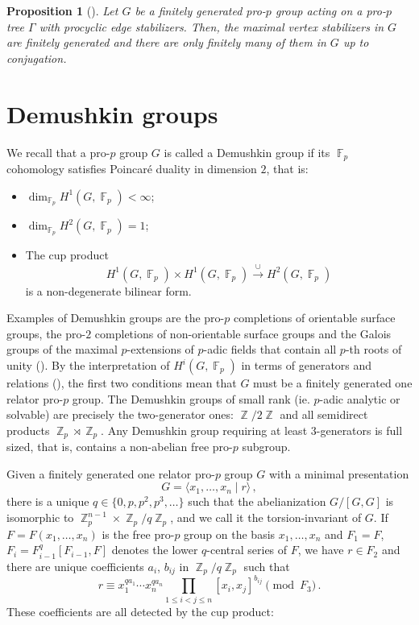 \documentclass[a4paper]{amsart}
\DeclareMathOperator{\bbz}{\mathbb{Z}}
\DeclareMathOperator{\bbf}{\mathbb{F}}
\newtheorem{prop}[thm]{Proposition}
\theoremstyle{definition}
\begin{document}
\begin{prop}[{\cite[Prop. 3.3]{snopceSubgroupPropertiesPro$p$2014}}]\label{prop-finitely-many-stabilizers} Let \(G\) be a finitely generated pro-\(p\) group acting on a pro-\(p\) tree \(\Gamma\) with procyclic edge stabilizers. Then, the maximal vertex stabilizers in \(G\) are finitely generated and there are only finitely many of them in \(G\) up to conjugation.
\end{prop}

\section{Demushkin groups}\label{sec-demushkin}

We recall that a pro-\(p\) group \(G\) is called a Demushkin group if its \(\bbf_p\) cohomology satisfies Poincaré duality in dimension \(2\), that is:
\begin{itemize}
    \item \(\dim_{\bbf_p} H^1(G,\bbf_p) < \infty\);
    \item \(\dim_{\bbf_p} H^2(G,\bbf_p) = 1\);
    \item The cup product \[H^1(G,\bbf_p) \times H^1(G,\bbf_p) \overset{\cup}{\to} H^2(G,\bbf_p)\] is a non-degenerate bilinear form.
\end{itemize}
Examples of Demushkin groups are the pro-\(p\) completions of orientable surface groups, the pro-\(2\) completions of non-orientable surface groups and the Galois groups of the maximal \(p\)-extensions of \(p\)-adic fields that contain all \(p\)-th roots of unity (\cite[Sec. 
 I.4.5, Thm. II.5.4]{serreGaloisCohomology1997}). By the interpretation of \(H^i(G,\bbf_p)\) in terms of generators and relations (\cite[Sec. I.4]{serreGaloisCohomology1997}), the first two conditions mean that \(G\) must be a finitely generated one relator pro-\(p\) group. The Demushkin groups of small rank (ie. \(p\)-adic analytic or solvable) are precisely the two-generator ones: \(\bbz/2\bbz\) and all semidirect products \(\bbz_p \rtimes \bbz_p\). Any Demushkin group requiring at least \(3\)-generators is full sized, that is, contains a non-abelian free pro-\(p\) subgroup.

Given a finitely generated one relator pro-\(p\) group \(G\) with a minimal presentation \[G = \langle x_1,\ldots,x_n\mid r\rangle\,,\] there is a unique \(q \in \{0,p,p^2,p^3,\ldots\}\) such that the abelianization \(G/[G,G]\) is isomorphic to \(\bbz_p^{n-1} \times \bbz_p/q\bbz_p\), and we call it the torsion-invariant of \(G\). If \(F = F(x_1,\ldots,x_n)\) is the free pro-\(p\) group on the basis \(x_1,\ldots,x_n\) and \(F_1 = F\), \(F_i = F_{i-1}^q[F_{i-1},F]\) denotes the lower \(q\)-central series of \(F\), we have \(r \in F_2\) and there are unique coefficients \(a_i\), \(b_{ij}\) in \(\bbz_p/q\bbz_p\) such that \[r \equiv x_1^{qa_1}\cdots x_n^{qa_n}\prod_{1\leq i < j \leq n}[x_i,x_j]^{b_{ij}} \pmod{F_3}\,.\] These coefficients are all detected by the cup product:
\end{document}
